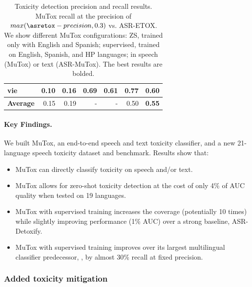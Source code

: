 \begin{table}[ht!]
\begin{tabular}{lrrrrrr}
vie & 0.10 & 0.16 &0.69 &0.61 &\textbf{0.77}& 0.60\\
\midrule
\textbf{Average} & 0.15 &	0.19& -&-	& 0.50&	\textbf{0.55}  \\
\bottomrule
\end{tabular}
\caption{Toxicity detection precision and recall results. MuTox recall at the precision of $max (\asretox-precision, 0.3)$ vs. ASR-ETOX. We show different MuTox configurations: ZS, trained only with English and Spanish; supervised, trained on English, Spanish, and HP languages; in speech (MuTox) or text (ASR-MuTox). The best results are bolded.\label{tab:toxicity:precrecallresults}}
\end{table}




\paragraph{Key Findings.} We built MuTox, an end-to-end speech and text toxicity classifier, and a new 21-language speech toxicity dataset and benchmark. Results show that:

\begin{itemize}
    \item MuTox can directly classify toxicity on speech and/or text. %
    \item MuTox allows for zero-shot toxicity detection at the cost of only 4\% of AUC quality when tested on 19 languages.
    \item MuTox with supervised training increases the coverage (potentially 10 times) while slightly improving performance (1\% AUC) over a strong baseline, ASR-Detoxify.
    \item MuTox with supervised training improves over its largest multilingual classifier predecessor, \asretox, by almost 30\% recall at fixed precision.
\end{itemize}


\subsubsection{Added toxicity mitigation}
\label{sec:toxicity:mintox}

